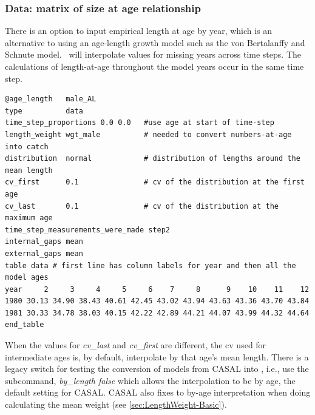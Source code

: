 \subsubsection{Data: matrix of size at age relationship}\label{sec:AgeLength-Data}

There is an option to input empirical length at age by year, which is an alternative to using an age-length growth model such as the von Bertalanffy and Schnute model. \CNAME\ will interpolate values for missing years across time steps. The calculations of length-at-age throughout the model years occur in the same time step.

{\small{\begin{verbatim}
@age_length   male_AL
type          data
time_step_proportions 0.0 0.0   #use age at start of time-step
length_weight wgt_male          # needed to convert numbers-at-age into catch
distribution  normal            # distribution of lengths around the mean length
cv_first      0.1               # cv of the distribution at the first age
cv_last       0.1               # cv of the distribution at the maximum age
time_step_measurements_were_made step2
internal_gaps mean
external_gaps mean
table data # first line has column labels for year and then all the model ages
year     2     3     4     5     6    7     8      9    10    11    12
1980 30.13 34.90 38.43 40.61 42.45 43.02 43.94 43.63 43.36 43.70 43.84
1981 30.33 34.78 38.03 40.15 42.22 42.89 44.21 44.07 43.99 44.32 44.64
end_table
\end{verbatim}}}

When the values for \textit{cv\_last} and \textit{cv\_first} are different, the cv used for intermediate ages is, by default, interpolate by that age's mean length. There is a legacy switch for testing the conversion of models from CASAL into \CNAME, i.e., use the subcommand, \textit{by\_length false} which allows the interpolation to be by age, the default setting for CASAL. CASAL also fixes to by-age interpretation when doing calculating the mean weight (see \ref{sec:LengthWeight-Basic}).



